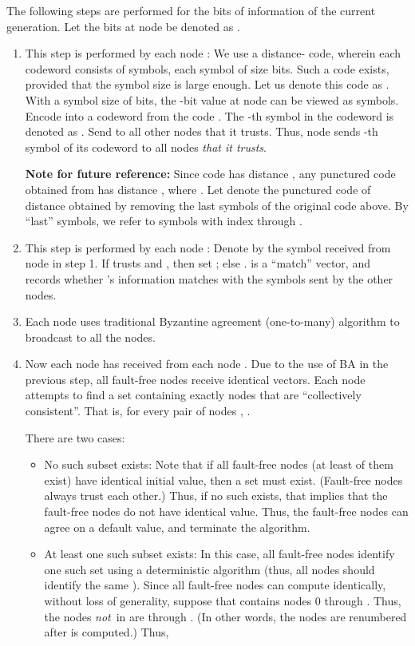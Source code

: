 \documentclass[12pt]{article}
\begin{document}
The following steps are performed for the  bits of information of the current generation.
Let the  bits at node  be denoted as .
\begin{enumerate}

\item This step is performed by each node :
We use a  distance- code, wherein each codeword
consists of  symbols, each symbol of size  bits.
Such a code exists, provided that the symbol size is large enough.
Let us denote this code as .
With a symbol size of  bits, the -bit value at node 
can be viewed as  symbols. Encode  into a
codeword  from the code .
The -th symbol in the codeword is denoted as .
Send  to all other nodes that it trusts.
Thus, node  sends -th symbol of its codeword
to all nodes {\em that it trusts}.

{\bf Note for future reference:}
Since code  has distance ,
any punctured  code obtained from 
has distance , where . Let  denote the
punctured  code of distance  obtained by removing the
last  symbols of the original  code above.
By ``last''  symbols, we refer to symbols with index  through .

\item This step is performed by each node :
Denote by  the symbol received from node  in step 1.
If  trusts  and , then set ; else .
 is a ``match'' vector, and records whether 's information matches
with the symbols sent by the other nodes.

\item Each node  uses traditional Byzantine agreement (one-to-many) algorithm
to broadcast  to all the nodes. 

\item Now each node  has received  from each node .
Due to the use of BA in the previous step, all fault-free nodes
receive identical  vectors.
Each node  attempts to find a set  containing exactly  nodes that are
``collectively consistent''. That is, for every pair
of nodes , .


There are two cases:
\begin{itemize}
\item No such subset  exists: Note that if all fault-free nodes
(at least  of them exist) have identical initial value, then a set
 must exist. (Fault-free nodes always trust each other.)
Thus, if no such  exists, that implies that the
fault-free nodes do not have identical value. Thus, the fault-free
nodes can agree on a default value, and terminate the algorithm.

\item At least one such subset  exists:
In this case, all fault-free nodes identify one such set  using
a deterministic algorithm (thus, all nodes should identify the same ).
Since all fault-free nodes can compute  identically,
without loss of generality, suppose that  contains nodes
0 through . Thus, the nodes {\em not}\, in  are  through .
(In other words, the nodes are renumbered after  is computed.)
Thus, 


\end{itemize}
\end{enumerate}
\end{document}

